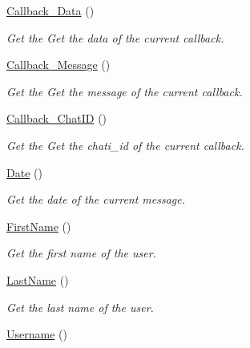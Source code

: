 \begin{DoxyCompactItemize}
\hyperlink{class_telegram_a0df77a257a02ef572ca7d745f659e98d}{Callback\-\_\-\-Data} ()
\begin{DoxyCompactList}\small\item\em Get the Get the data of the current callback. \end{DoxyCompactList}\item 
\hyperlink{class_telegram_ad72a9632c75419625e9f194f400a31c9}{Callback\-\_\-\-Message} ()
\begin{DoxyCompactList}\small\item\em Get the Get the message of the current callback. \end{DoxyCompactList}\item 
\hyperlink{class_telegram_a848317ddda1c61f7173e55e0253b12e0}{Callback\-\_\-\-Chat\-I\-D} ()
\begin{DoxyCompactList}\small\item\em Get the Get the chati\-\_\-id of the current callback. \end{DoxyCompactList}\item 
\hyperlink{class_telegram_aff49fc2cda4491ff4457ca481bb8edf9}{Date} ()
\begin{DoxyCompactList}\small\item\em Get the date of the current message. \end{DoxyCompactList}\item 
\hypertarget{class_telegram_a0e3e32188dd1631ed1ed673ac844d999}{\hyperlink{class_telegram_a0e3e32188dd1631ed1ed673ac844d999}{First\-Name} ()}\label{class_telegram_a0e3e32188dd1631ed1ed673ac844d999}

\begin{DoxyCompactList}\small\item\em Get the first name of the user. \end{DoxyCompactList}\item 
\hypertarget{class_telegram_acf2c54b7fd06550cd64cf72194709a2c}{\hyperlink{class_telegram_acf2c54b7fd06550cd64cf72194709a2c}{Last\-Name} ()}\label{class_telegram_acf2c54b7fd06550cd64cf72194709a2c}

\begin{DoxyCompactList}\small\item\em Get the last name of the user. \end{DoxyCompactList}\item 
\hypertarget{class_telegram_a2521c81c6e75e23a361cc5a8a146f9c9}{\hyperlink{class_telegram_a2521c81c6e75e23a361cc5a8a146f9c9}{Username} ()}\label{class_telegram_a2521c81c6e75e23a361cc5a8a146f9c9}


\end{DoxyCompactItemize}
